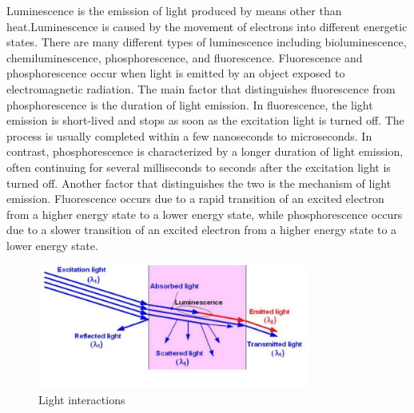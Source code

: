 \documentclass{article}
\begin{document}
{                \hspace{0.5cm}Luminescence is the emission of light produced by means other than heat.Luminescence is caused by the movement of electrons into different energetic states. There are many different types of luminescence including bioluminescence, chemiluminescence, phosphorescence, and fluorescence. Fluorescence and phosphorescence occur when light is emitted by an object exposed to electromagnetic radiation. The main factor that distinguishes fluorescence from phosphorescence is the duration of light emission. In fluorescence, the light emission is short-lived and stops as soon as the excitation light is turned off. The process is usually completed within a few nanoseconds to microseconds. In contrast, phosphorescence is characterized by a longer duration of light emission, often continuing for several milliseconds to seconds after the excitation light is turned off. Another factor that distinguishes the two is the mechanism of light emission. Fluorescence occurs due to a rapid transition of an excited electron from a higher energy state to a lower energy state, while phosphorescence occurs due to a slower transition of an excited electron from a higher energy state to a lower energy state.
                \vspace*{5\baselineskip}
                
                \begin{figure}[htb]
                    \centering
                    \includegraphics[width=0.8\textwidth]{Figures/lightPhen.PNG}
                    \caption{Light interactions}
                    \label{fig:example}
                \end{figure}
            \newpage
}
\end{document}
